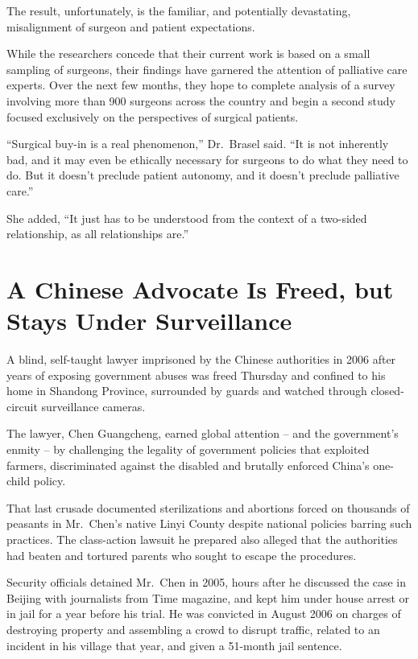 ﻿\documentclass[12pt]{article}
\begin{document}
The result, unfortunately, is the familiar, and potentially devastating, misalignment of surgeon and
patient expectations.

While the researchers concede that their current work is based on a small sampling of surgeons,
their findings have garnered the attention of palliative care experts. Over the next few months,
they hope to complete analysis of a survey involving more than 900 surgeons across the country and
begin a second study focused exclusively on the perspectives of surgical patients.

``Surgical buy-in is a real phenomenon,'' Dr.~Brasel said. ``It is not inherently bad, and it may
even be ethically necessary for surgeons to do what they need to do. But it doesn't preclude patient
autonomy, and it doesn't preclude palliative care.''

She added, ``It just has to be understood from the context of a two-sided relationship, as all
relationships are.''

\pagebreak
\section{A Chinese Advocate Is Freed, but Stays Under Surveillance}

\lettrine{A}{} blind, self-taught lawyer imprisoned by the Chinese
authorities in 2006 after years of exposing government abuses was freed Thursday and confined to his
home in Shandong Province, surrounded by guards and watched through closed-circuit surveillance
cameras.

The lawyer, Chen Guangcheng, earned global attention -- and the government's enmity -- by
challenging the legality of government policies that exploited farmers, discriminated against the
disabled and brutally enforced China's one-child policy.

That last crusade documented sterilizations and abortions forced on thousands of peasants in
Mr.~Chen's native Linyi County despite national policies barring such practices. The class-action
lawsuit he prepared also alleged that the authorities had beaten and tortured parents who sought to
escape the procedures.

Security officials detained Mr.~Chen in 2005, hours after he discussed the case in Beijing with
journalists from Time magazine, and kept him under house arrest or in jail for a year before his
trial. He was convicted in August 2006 on charges of destroying property and assembling a crowd to
disrupt traffic, related to an incident in his village that year, and given a 51-month jail
sentence.
\end{document}

